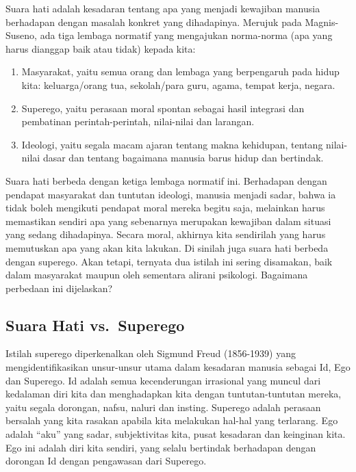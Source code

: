 \documentclass[11pt,twoside,a5paper,openany]{memoir}
\def\tightlist{}
\begin{document}
Suara hati adalah kesadaran tentang apa yang menjadi kewajiban manusia
berhadapan dengan masalah konkret yang dihadapinya. Merujuk pada
Magnis-Suseno, ada tiga lembaga normatif yang mengajukan norma-norma
(apa yang harus dianggap baik atau tidak) kepada kita:

\begin{enumerate}
\def\labelenumi{\arabic{enumi}.}
\tightlist
\item
  Masyarakat, yaitu semua orang dan lembaga yang berpengaruh pada hidup
  kita: keluarga/orang tua, sekolah/para guru, agama, tempat kerja,
  negara.
\item
  Superego, yaitu perasaan moral spontan sebagai hasil integrasi dan
  pembatinan perintah-perintah, nilai-nilai dan larangan.
\item
  Ideologi, yaitu segala macam ajaran tentang makna kehidupan, tentang
  nilai-nilai dasar dan tentang bagaimana manusia barus hidup dan
  bertindak.
\end{enumerate}

Suara hati berbeda dengan ketiga lembaga normatif ini. Berhadapan dengan
pendapat masyarakat dan tuntutan ideologi, manusia menjadi sadar, bahwa
ia tidak boleh mengikuti pendapat moral mereka begitu saja, melainkan
harus memastikan sendiri apa yang sebenarnya merupakan kewajiban dalam
situasi yang sedang dihadapinya. Secara moral, akhirnya kita sendirilah
yang harus memutuskan apa yang akan kita lakukan. Di sinilah juga suara
hati berbeda dengan superego. Akan tetapi, ternyata dua istilah ini
sering disamakan, baik dalam masyarakat maupun oleh sementara alirani
psikologi. Bagaimana perbedaan ini dijelaskan?

\hypertarget{suara-hati-vs.-superego}{%
\subsection{Suara Hati vs.~Superego}\label{suara-hati-vs.-superego}}

Istilah superego diperkenalkan oleh Sigmund Freud (1856-1939) yang
mengidentifikasikan unsur-unsur utama dalam kesadaran manusia sebagai
Id, Ego dan Superego. Id adalah semua kecenderungan irrasional yang
muncul dari kedalaman diri kita dan menghadapkan kita dengan
tuntutan-tuntutan mereka, yaitu segala dorongan, nafsu, naluri dan
insting. Superego adalah perasaan bersalah yang kita rasakan apabila
kita melakukan hal-hal yang terlarang. Ego adalah ``aku'' yang sadar,
subjektivitas kita, pusat kesadaran dan keinginan kita. Ego ini adalah
diri kita sendiri, yang selalu bertindak berhadapan dengan dorongan Id
dengan pengawasan dari Superego.
\end{document}

